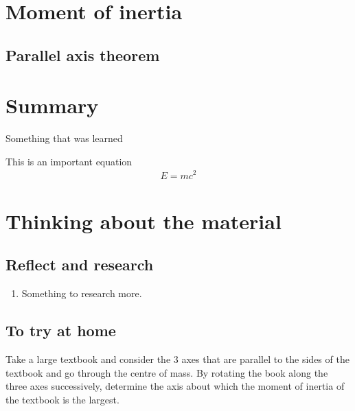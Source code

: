 \section{Moment of inertia}

\subsection{Parallel axis theorem}





\newpage
\section{Summary}

\begin{chapterSummary}{
\item Something that was learned
}
\end{chapterSummary}

\newpage
\begin{importantEquations}
This is an important equation
\begin{align*}
E = mc^2
\end{align*}

\end{importantEquations}


\newpage
\section{Thinking about the material}
\subsection{Reflect and research}

\begin{enumerate}
\item Something to research more.
\end{enumerate}
\subsection{To try at home}

\begin{tQuestion}Take a large textbook and consider the 3 axes that are parallel to the sides of the textbook and go through the centre of mass. By rotating the book along the three axes successively, determine the axis about which the moment of inertia of the textbook is the largest.\end{tQuestion}

